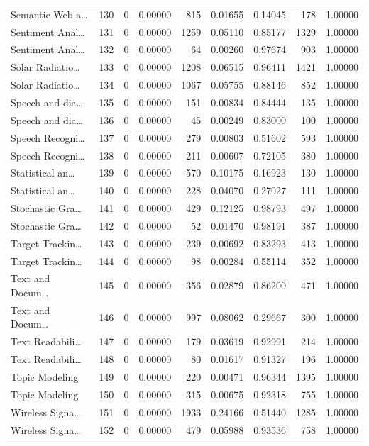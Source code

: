 \begin{table}
\begin{tabular}{lrrrrrrrr}
Semantic Web a… & 130 & 0 & 0.00000 & 815 & 0.01655 & 0.14045 & 178 & 1.00000 \\
Sentiment Anal… & 131 & 0 & 0.00000 & 1259 & 0.05110 & 0.85177 & 1329 & 1.00000 \\
Sentiment Anal… & 132 & 0 & 0.00000 & 64 & 0.00260 & 0.97674 & 903 & 1.00000 \\
Solar Radiatio… & 133 & 0 & 0.00000 & 1208 & 0.06515 & 0.96411 & 1421 & 1.00000 \\
Solar Radiatio… & 134 & 0 & 0.00000 & 1067 & 0.05755 & 0.88146 & 852 & 1.00000 \\
Speech and dia… & 135 & 0 & 0.00000 & 151 & 0.00834 & 0.84444 & 135 & 1.00000 \\
Speech and dia… & 136 & 0 & 0.00000 & 45 & 0.00249 & 0.83000 & 100 & 1.00000 \\
Speech Recogni… & 137 & 0 & 0.00000 & 279 & 0.00803 & 0.51602 & 593 & 1.00000 \\
Speech Recogni… & 138 & 0 & 0.00000 & 211 & 0.00607 & 0.72105 & 380 & 1.00000 \\
Statistical an… & 139 & 0 & 0.00000 & 570 & 0.10175 & 0.16923 & 130 & 1.00000 \\
Statistical an… & 140 & 0 & 0.00000 & 228 & 0.04070 & 0.27027 & 111 & 1.00000 \\
Stochastic Gra… & 141 & 0 & 0.00000 & 429 & 0.12125 & 0.98793 & 497 & 1.00000 \\
Stochastic Gra… & 142 & 0 & 0.00000 & 52 & 0.01470 & 0.98191 & 387 & 1.00000 \\
Target Trackin… & 143 & 0 & 0.00000 & 239 & 0.00692 & 0.83293 & 413 & 1.00000 \\
Target Trackin… & 144 & 0 & 0.00000 & 98 & 0.00284 & 0.55114 & 352 & 1.00000 \\
Text and Docum… & 145 & 0 & 0.00000 & 356 & 0.02879 & 0.86200 & 471 & 1.00000 \\
Text and Docum… & 146 & 0 & 0.00000 & 997 & 0.08062 & 0.29667 & 300 & 1.00000 \\
Text Readabili… & 147 & 0 & 0.00000 & 179 & 0.03619 & 0.92991 & 214 & 1.00000 \\
Text Readabili… & 148 & 0 & 0.00000 & 80 & 0.01617 & 0.91327 & 196 & 1.00000 \\
Topic Modeling & 149 & 0 & 0.00000 & 220 & 0.00471 & 0.96344 & 1395 & 1.00000 \\
Topic Modeling & 150 & 0 & 0.00000 & 315 & 0.00675 & 0.92318 & 755 & 1.00000 \\
Wireless Signa… & 151 & 0 & 0.00000 & 1933 & 0.24166 & 0.51440 & 1285 & 1.00000 \\
Wireless Signa… & 152 & 0 & 0.00000 & 479 & 0.05988 & 0.93536 & 758 & 1.00000 \\
\bottomrule
\end{tabular}
\end{table}
